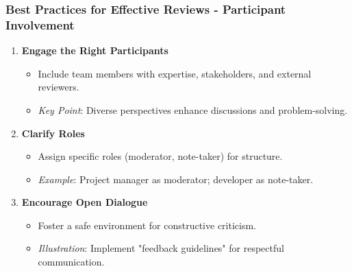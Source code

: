 \documentclass[aspectratio=169]{beamer}
\begin{document}
\begin{frame}[fragile]
    \frametitle{Best Practices for Effective Reviews - Participant Involvement}
    \begin{enumerate}
        \item \textbf{Engage the Right Participants}
            \begin{itemize}
                \item Include team members with expertise, stakeholders, and external reviewers.
                \item \textit{Key Point}: Diverse perspectives enhance discussions and problem-solving.
            \end{itemize}

        \item \textbf{Clarify Roles}
            \begin{itemize}
                \item Assign specific roles (moderator, note-taker) for structure.
                \item \textit{Example}: Project manager as moderator; developer as note-taker.
            \end{itemize}
        
        \item \textbf{Encourage Open Dialogue}
            \begin{itemize}
                \item Foster a safe environment for constructive criticism.
                \item \textit{Illustration}: Implement "feedback guidelines" for respectful communication.
            \end{itemize}
    \end{enumerate}
\end{frame}
\end{document}

